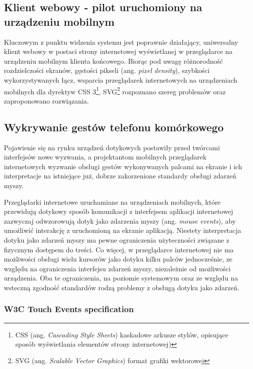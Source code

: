 \subsection{Klient webowy - pilot uruchomiony na urządzeniu mobilnym}

Kluczowym z punktu widzenia systemu jest poprawnie działający, uniwersalny klient webowy w postaci strony internetowej wyświetlanej w przeglądarce na urządzeniu mobilnym klienta końcowego. Biorąc pod uwagę różnorodność rozdzielczości ekranów, gęstości pikseli (ang. \emph{pixel density}), szybkości wykorzystywanych łącz, wsparcia przeglądarek internetowych na urządzeniach mobilnych dla dyrektyw CSS 3\footnote{CSS (ang. \emph{Cascading Style Sheets}) kaskadowe arkusze stylów, opisujące sposób wyświetlania elementów strony internetowej)}, SVG\footnote{SVG (ang. \emph{Scalable Vector Graphics}) format grafiki wektorowej} rozpoznano szereg problemów oraz zaproponowano rozwiązania.

\subsection{Wykrywanie gestów telefonu komórkowego}

Pojawienie się na rynku urządzeń dotykowych postawiły przed twórcami interfejsów nowe wyzwania, a projektantom mobilnych przeglądarek internetowych wyzwanie obsługi gestów wykonywanych palcami na ekranie i ich interpretacje na istniejące już, dobrze zakorzenione standardy obsługi zdarzeń myszy.

Przeglądarki internetowe uruchamiane na urządzeniach mobilnych, które przewidują dotykowy sposób komunikacji z interfejsem aplikacji internetowej zazwyczaj odwzorowują dotyk jako zdarzenia myszy (ang. \emph{mouse events}), aby umożliwić interakcję z uruchomioną na ekranie aplikacją. Niestety interpretacja dotyku jako zdarzeń myszy ma pewne ograniczenia użyteczności związane z fizycznym dostępem do treści. Co więcej, w przeglądarce internetowej nie ma możliwości obsługi wielu kursorów jako dotyku kilku palców jednocześnie, ze względu na ograniczenia interfejsu zdarzeń myszy, niezależnie od możliwości urządzenia. Oba te ograniczenia, na poziomie systemowym oraz ze względu na wsteczną zgodność standardów rodzą problemy z obsługą dotyku jako zdarzeń.

\subsubsection{W3C Touch Events specification}

